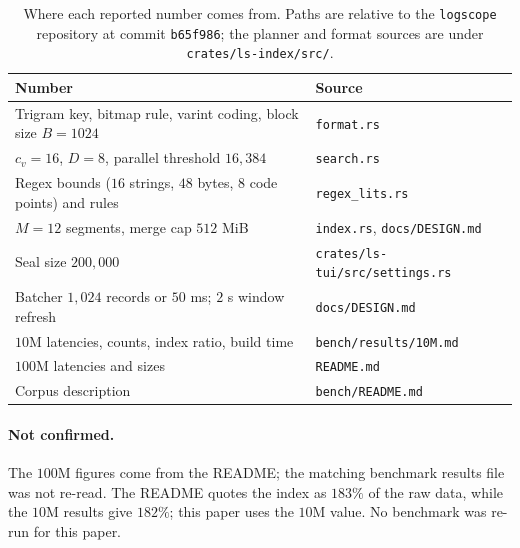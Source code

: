 \documentclass[11pt]{article}
\theoremstyle{plain}
\theoremstyle{definition}
\theoremstyle{remark}
\newcommand{\code}[1]{\texttt{#1}}
\begin{document}
\begin{table}[htbp]
\centering
\caption{Where each reported number comes from. Paths are relative to the
\code{logscope} repository at commit \code{b65f986}; the planner and format
sources are under \code{crates/ls-index/src/}.}
\label{tab:provenance}
\small
\begin{tabular}{>{\raggedright\arraybackslash}p{} >{\raggedright\arraybackslash}p{}}
\toprule
Number & Source \\
\midrule
Trigram key, bitmap rule, varint coding, block size $B = 1024$ & \code{format.rs} \\
$c_v = 16$, $D = 8$, parallel threshold $16{,}384$ & \code{search.rs} \\
Regex bounds ($16$ strings, $48$ bytes, $8$ code points) and rules & \code{regex\_lits.rs} \\
$M = 12$ segments, merge cap $512$ MiB & \code{index.rs}, \code{docs/DESIGN.md} \\
Seal size $200{,}000$ & \code{crates/ls-tui/src/settings.rs} \\
Batcher $1{,}024$ records or $50$ ms; $2$ s window refresh & \code{docs/DESIGN.md} \\
$10$M latencies, counts, index ratio, build time & \code{bench/results/10M.md} \\
$100$M latencies and sizes & \code{README.md} \\
Corpus description & \code{bench/README.md} \\
\bottomrule
\end{tabular}
\end{table}

\paragraph{Not confirmed.} The $100$M figures come from the README; the
matching benchmark results file was not re-read. The README quotes the index
as $183\%$
of the raw data, while the $10$M results give $182\%$; this paper uses the $10$M
value. No benchmark was re-run for this paper.
\end{document}
